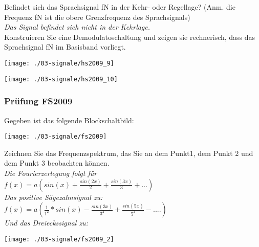 Befindet sich das Sprachsignal fN in der Kehr- oder Regellage? (Anm. die Frequenz fN ist die obere Grenzfrequenz des Sprachsignals)\\
\textit{Das Signal befindet sich nicht in der Kehrlage.}\\

Konstruieren Sie eine Demodulatoschaltung und zeigen sie rechnerisch, dass das Sprachsignal fN im Basisband vorliegt.\\
\begin{center}
    \vspace{-8pt}
    \texttt{[image: ./03-signale/hs2009\_9]}
    \vspace{-8pt}
\end{center}

\begin{center}
    \vspace{-8pt}
    \texttt{[image: ./03-signale/hs2009\_10]}
    \vspace{-8pt}
\end{center}

\subsubsection{Prüfung FS2009}
Gegeben ist das folgende Blockschaltbild:
\begin{center}
    \vspace{-8pt}
    \texttt{[image: ./03-signale/fs2009]}
    \vspace{-8pt}
\end{center}

Zeichnen Sie das Frequenzspektrum, das Sie an dem Punkt1, dem Punkt 2 und dem Punkt 3 beobachten können.\\
\textit{Die Fourierzerlegung folgt für}\\
$f(x)=a(sin(x)+\frac{sin(2x)}{2}+\frac{sin(3x)}{3}+...)$\\

\textit{Das positive Sägezahnsignal zu:}\\
$f(x)=a(\frac{1}{1^2}*sin(x)-\frac{sin(3x)}{3^2}+\frac{sin(5x)}{5^2}-....)$\\

\textit{Und das Dreieckssignal zu:}
\begin{center}
    \vspace{-8pt}
    \texttt{[image: ./03-signale/fs2009\_2]}
    \vspace{-8pt}
\end{center}



